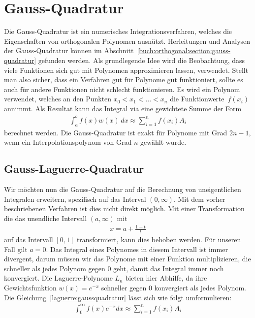 %
%
%
\section{Gauss-Quadratur
  \label{laguerre:section:quadratur}}
Die Gauss-Quadratur ist ein numerisches Integrationsverfahren,
welches die Eigenschaften von orthogonalen Polynomen ausnützt.
Herleitungen und Analysen der Gauss-Quadratur können im 
Abschnitt~\ref{buch:orthogonal:section:gauss-quadratur} gefunden werden.
Als grundlegende Idee wird die Beobachtung,
dass viele Funktionen sich gut mit Polynomen approximieren lassen,
verwendet.
Stellt man also sicher,
dass ein Verfahren gut für Polynome gut funktioniert, 
sollte es auch für andere Funktionen nicht schlecht funktionieren.
Es wird ein Polynom verwendet, 
welches an den Punkten $x_0 < x_1 < \ldots < x_n$ 
die Funktionwerte~$f(x_i)$ annimmt.
Als Resultat kann das Integral via eine gewichtete Summe der Form
\begin{align}
\int_a^b f(x) w(x) \, dx
\approx
\sum_{i=1}^n f(x_i) A_i
\label{laguerre:gaussquadratur}
\end{align}
berechnet werden.
Die Gauss-Quadratur ist exakt für Polynome mit Grad $2n -1$,
wenn ein Interpolationspolynom von Grad $n$ gewählt wurde.

\subsection{Gauss-Laguerre-Quadratur
\label{laguerre:subsection:gausslag-quadratur}}
Wir möchten nun die Gauss-Quadratur auf die Berechnung
von uneigentlichen Integralen erweitern,
spezifisch auf das Interval $(0, \infty)$.
Mit dem vorher beschriebenen Verfahren ist dies nicht direkt möglich.
Mit einer Transformation die das unendliche Intervall $(a, \infty)$ mit
\begin{align*}
x
=
a + \frac{1 - t}{t}
\end{align*}
auf das Intervall $[0, 1]$ transformiert,
kann dies behoben werden.
Für unseren Fall gilt $a = 0$.
Das Integral eines Polynomes in diesem Intervall ist immer divergent,
darum müssen wir das Polynome mit einer Funktion multiplizieren,
die schneller als jedes Polynom gegen $0$ geht,
damit das Integral immer noch konvergiert.
Die Laguerre-Polynome $L_n$ bieten hier Abhilfe,
da ihre Gewichtsfunktion $w(x) = e^{-x}$ schneller
gegen $0$ konvergiert als jedes Polynom.
Die Gleichung~\eqref{laguerre:gaussquadratur} lässt sich wie folgt
umformulieren:
\begin{align}
\int_{0}^{\infty} f(x) e^{-x} dx
\approx
\sum_{i=1}^{n} f(x_i) A_i
\label{laguerre:laguerrequadratur}
\end{align}

